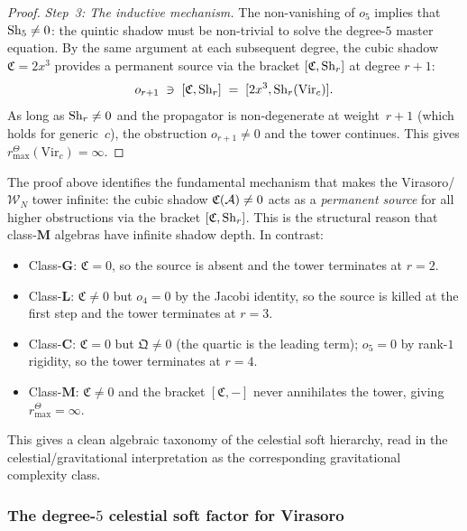\begin{proof}
\medskip\noindent
\emph{Step~3: The inductive mechanism.}\;
The non-vanishing of $o_5$ implies that $\operatorname{Sh}_5 \neq 0$: the
quintic shadow must be non-trivial to solve the degree-$5$ master
equation. By the same argument at each subsequent degree, the
cubic shadow $\mathfrak{C} = 2x^3$ provides a permanent source
via the bracket $[\mathfrak{C}, \operatorname{Sh}_r]$ at degree $r+1$:
\[
o_{r+1} \;\ni\;
[\mathfrak{C}, \operatorname{Sh}_r]
\;=\;
[2x^3, \operatorname{Sh}_r(\mathrm{Vir}_c)].
\]
As long as $\operatorname{Sh}_r \neq 0$ and the propagator is non-degenerate
at weight~$r+1$ (which holds for generic~$c$), the obstruction
$o_{r+1} \neq 0$ and the tower continues. This gives
\(r^\Theta_{\max}(\mathrm{Vir}_c)=\infty\).
\end{proof}

\begin{remark}
\label{rem:thqg-VI-cubic-source}
The proof above identifies the fundamental mechanism that makes
the Virasoro/\hskip0pt$\mathcal{W}_N$ tower infinite: the
cubic shadow $\mathfrak{C}(\mathcal{A}) \neq 0$ acts as a
\emph{permanent source} for all higher obstructions via the
bracket $[\mathfrak{C}, \operatorname{Sh}_r]$. This is the structural
reason that class-$\mathbf{M}$ algebras have infinite shadow
depth. In contrast:
\begin{itemize}
\item Class-$\mathbf{G}$: $\mathfrak{C} = 0$, so
 the source is absent and the tower terminates at $r = 2$.
\item Class-$\mathbf{L}$: $\mathfrak{C} \neq 0$ but
 $o_4 = 0$ by the Jacobi identity, so the source is
 killed at the first step and the tower terminates at $r = 3$.
\item Class-$\mathbf{C}$: $\mathfrak{C} = 0$ but
 $\mathfrak{Q} \neq 0$ (the quartic is the leading term);
 $o_5 = 0$ by rank-$1$ rigidity, so the tower terminates at
 $r = 4$.
\item Class-$\mathbf{M}$: $\mathfrak{C} \neq 0$ and the
 bracket $[\mathfrak{C}, -]$ never annihilates the tower,
 giving \(r^\Theta_{\max}=\infty\).
\end{itemize}
This gives a clean algebraic taxonomy of the celestial soft
hierarchy, read in the celestial/gravitational interpretation as
the corresponding gravitational complexity class.
\end{remark}

\subsubsection{The degree-$5$ celestial soft factor for Virasoro}

